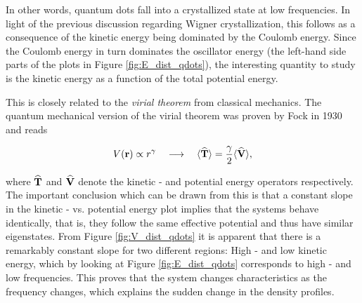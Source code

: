 In other words, quantum dots fall into a crystallized state at low frequencies. In light of the previous discussion regarding Wigner crystallization, this follows as a consequence of the kinetic energy being dominated by the Coulomb energy. Since the Coulomb energy in turn dominates the oscillator energy (the left-hand side parts of the plots in Figure \ref{fig:E_dist_qdots}), the interesting quantity to study is the kinetic energy as a function of the total potential energy. 

This is closely related to the \textit{virial theorem} from classical mechanics. The quantum mechanical version of the virial theorem was proven by Fock in 1930 \cite{FockVirial} and reads

\begin{equation}
 V(\mathbf{r}) \propto r^\gamma \quad\longrightarrow\quad \langle {\bf\widehat{T}} \rangle = \frac{\gamma}{2} \langle {\bf\widehat{V}} \rangle, \label{eq:virial}
\end{equation}

where ${\bf\widehat{T}}$ and ${\bf\widehat{V}}$ denote the kinetic - and potential energy operators respectively. The important conclusion which can be drawn from this is that a constant slope in the kinetic - vs. potential energy plot implies that the systems behave identically, that is, they follow the same effective potential and thus have similar eigenstates. From Figure \ref{fig:V_dist_qdots} it is apparent that there is a remarkably constant slope for two different regions: High - and low kinetic energy, which by looking at Figure \ref{fig:E_dist_qdots} corresponds to high - and low frequencies. This proves that the system changes characteristics as the frequency changes, which explains the sudden change in the density profiles.



\newpage

